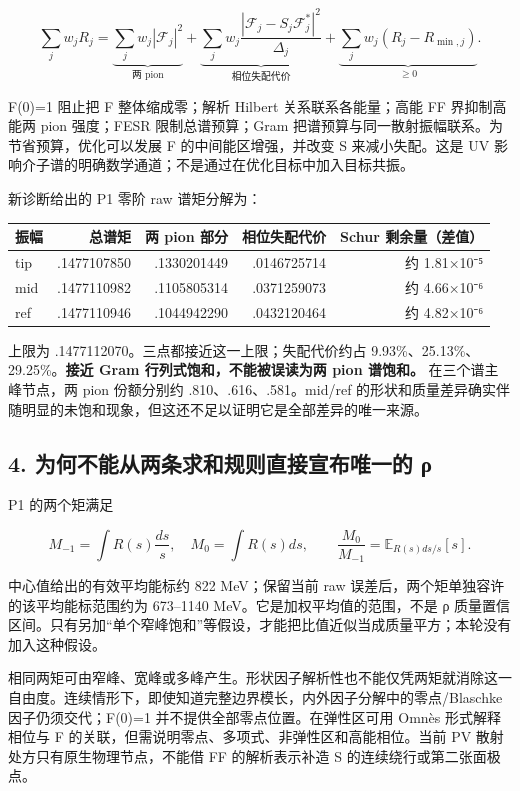 \documentclass[
  11pt,
  a4paper,
]{article}
\newcounter{none} %
\begin{document}
\[
\sum_j w_jR_j=
\underbrace{\sum_jw_j|\mathcal F_j|^2}_{\text{两 pion}}
+\underbrace{\sum_jw_j\frac{|\mathcal F_j-S_j\mathcal F_j^*|^2}{\Delta_j}}_{\text{相位失配代价}}
+\underbrace{\sum_jw_j(R_j-R_{\min,j})}_{\ge0}.
\tag{4}
\]

F(0)=1 阻止把 F 整体缩成零；解析 Hilbert 关系联系各能量；高能 FF
界抑制高能两 pion 强度；FESR 限制总谱预算；Gram
把谱预算与同一散射振幅联系。为节省预算，优化可以发展 F
的中间能区增强，并改变 S 来减小失配。这是 UV
影响介子谱的明确数学通道；不是通过在优化目标中加入目标共振。

新诊断给出的 P1 零阶 raw 谱矩分解为：

{\def\LTcaptype{none} %
\begin{longtable}[]{@{}lrrrr@{}}
\toprule\noalign{}
振幅 & 总谱矩 & 两 pion 部分 & 相位失配代价 & Schur 剩余量（差值） \\
\midrule\noalign{}
\endhead
\bottomrule\noalign{}
\endlastfoot
tip & .1477107850 & .1330201449 & .0146725714 & 约 1.81×10⁻⁵ \\
mid & .1477110982 & .1105805314 & .0371259073 & 约 4.66×10⁻⁶ \\
ref & .1477110946 & .1044942290 & .0432120464 & 约 4.82×10⁻⁶ \\
\end{longtable}
}

上限为 .1477112070。三点都接近这一上限；失配代价约占
9.93\%、25.13\%、29.25\%。\textbf{接近 Gram 行列式饱和，不能被误读为两
pion 谱饱和。} 在三个谱主峰节点，两 pion 份额分别约
.810、.616、.581。mid/ref
的形状和质量差异确实伴随明显的未饱和现象，但这还不足以证明它是全部差异的唯一来源。

\subsection{4. 为何不能从两条求和规则直接宣布唯一的
ρ}\label{ux4e3aux4f55ux4e0dux80fdux4eceux4e24ux6761ux6c42ux548cux89c4ux5219ux76f4ux63a5ux5ba3ux5e03ux552fux4e00ux7684-ux3c1}

P1 的两个矩满足

\[
M_{-1}=\int R(s)\frac{ds}{s},\quad M_0=\int R(s)ds,
\qquad \frac{M_0}{M_{-1}}=\mathbb E_{R(s)ds/s}[s].
\]

中心值给出的有效平均能标约 822 MeV；保留当前 raw
误差后，两个矩单独容许的该平均能标范围约为 673--1140
MeV。它是加权平均值的范围，不是 ρ
质量置信区间。只有另加``单个窄峰饱和''等假设，才能把比值近似当成质量平方；本轮没有加入这种假设。

相同两矩可由窄峰、宽峰或多峰产生。形状因子解析性也不能仅凭两矩就消除这一自由度。连续情形下，即使知道完整边界模长，内外因子分解中的零点/Blaschke
因子仍须交代；F(0)=1 并不提供全部零点位置。在弹性区可用 Omnès
形式解释相位与 F 的关联，但需说明零点、多项式、非弹性区和高能相位。当前
PV 散射处方只有原生物理节点，不能借 FF 的解析表示补造 S
的连续绕行或第二张面极点。
\end{document}

